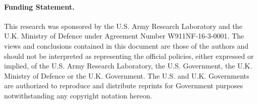 
\paragraph*{Funding Statement.} This  research  was  sponsored  by  the  U.S.  Army  Research Laboratory  and  the  U.K.  Ministry  of  Defence  under  Agreement Number W911NF-16-3-0001. The views and conclusions contained in this document are those of the authors and should not  be  interpreted  as  representing  the  official  policies,  either expressed or implied, of the U.S. Army Research Laboratory, the  U.S.  Government,  the  U.K.  Ministry  of  Defence  or  the U.K.  Government.  The  U.S.  and  U.K.  Governments  are  authorized  to  reproduce  and  distribute  reprints  for  Government purposes notwithstanding any copyright notation hereon.